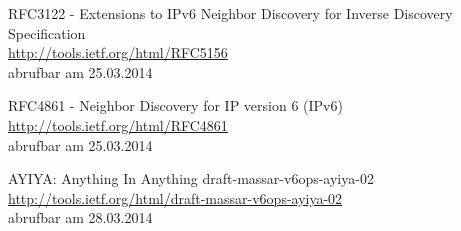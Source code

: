 \documentclass[a4paper,12pt]{scrartcl}
\begin{document}
\begin{thebibliography}{999}
 RFC3122 -  Extensions to IPv6 Neighbor Discovery for Inverse Discovery Specification\\
\url{http://tools.ietf.org/html/RFC5156}\\
abrufbar am 25.03.2014

 RFC4861 - Neighbor Discovery for IP version 6 (IPv6) \\
\url{http://tools.ietf.org/html/RFC4861}\\
abrufbar am 25.03.2014

 AYIYA: Anything In Anything draft-massar-v6ops-ayiya-02\\
\url{http://tools.ietf.org/html/draft-massar-v6ops-ayiya-02}\\
abrufbar am 28.03.2014

\end{thebibliography}
 
 
\end{document}
